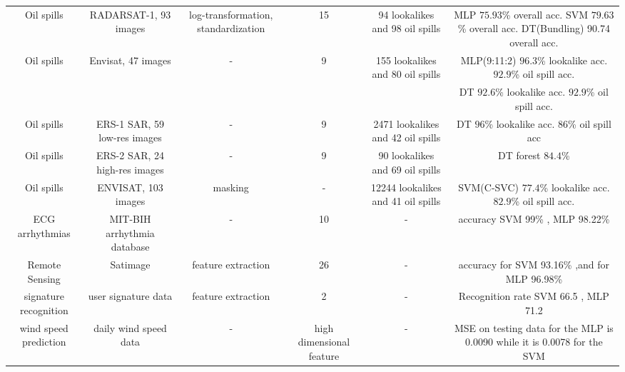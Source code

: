 \begin{table*}[t]
{\begin{tabular}{*{6}{c}}
    Oil spills\cite{Xu201414} &  RADARSAT-1, 93 images & log-transformation, standardization & 15 & 94 lookalikes and 98 oil spills & MLP $75.93$\% overall acc. SVM $79.63$\% overall acc. DT(Bundling) 90.74 overall acc.\\
    
    Oil spills\cite{Mera201472} &  Envisat, 47 images & - & 9 & 155 lookalikes and 80 oil spills & MLP(9:11:2) $96.3$\% lookalike acc. $92.9$\% oil spill acc. \\
    & & & & & DT $92.6$\% lookalike acc. $92.9$\% oil spill acc. \\
    
    Oil spills\cite{Delfrate1996} &  ERS-1 SAR, 59 low-res images & - & 9 & 2471 lookalikes and 42 oil spills & DT $96$\% lookalike acc. $86$\% oil spill acc\\
    
    Oil spills\cite{Topouzelis201268} &  ERS-2 SAR, 24 high-res images & - & 9 & 90 lookalikes and 69 oil spills & DT forest $84.4$\%\\ 
    
    Oil spills\cite{brekke2008classifiers} & ENVISAT, 103 images & masking & - & 12244 lookalikes and 41 oil spills & SVM(C-SVC) $77.4$\% lookalike acc. $82.9$\% oil spill acc.\\

    ECG arrhythmias\cite{Moavenian20103088} & MIT-BIH arrhythmia database & - & 10 & - & accuracy SVM 99\% , MLP 98.22\% \\

    Remote Sensing\cite{Zanaty2012177} & Satimage & feature extraction & 26& - & accuracy for SVM 93.16\% ,and for MLP 96.98\%\\
    
    signature recognition\cite{FriasMartinez2006693} & user signature data &feature extraction& 2 & - & Recognition rate SVM 66.5  , MLP 71.2\\
    wind speed prediction\cite{Mohandes2004939}& daily wind speed data & - &high dimensional feature & - & MSE on testing data for the MLP is 0.0090 while it is 0.0078 for the SVM\\
    
    
\end{tabular}
}
\end{table*}

